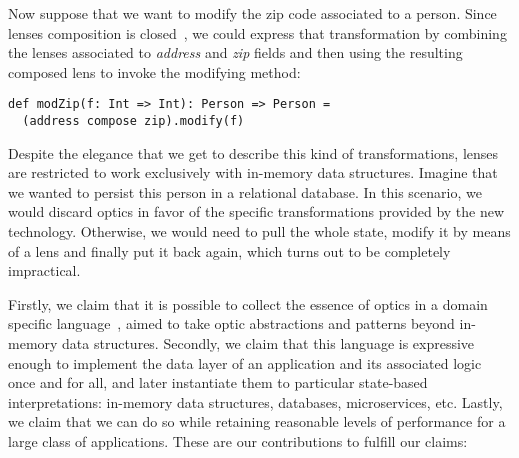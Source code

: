 \documentclass[final, twocolumn, 3p]{elsarticle}
\begin{document}
Now suppose that we want to modify the zip code associated to a person. Since
lenses composition is closed~\cite{pickering2017profunctor}, we could express
that transformation by combining the lenses associated to \emph{address} and
\emph{zip} fields and then using the resulting composed lens to invoke the
modifying method:

\begin{lstlisting}
def modZip(f: Int => Int): Person => Person =
  (address compose zip).modify(f)
\end{lstlisting}

Despite the elegance that we get to describe this kind of transformations,
lenses are restricted to work exclusively with in-memory data structures.
Imagine that we wanted to persist this person in a relational database. In this
scenario, we would discard optics in favor of the specific transformations
provided by the new technology. Otherwise, we would need to pull the whole
state, modify it by means of a lens and finally put it back again, which turns
out to be completely impractical.

Firstly, we claim that it is possible to collect the essence of optics in a
domain specific language~\cite{hudak1996building}, aimed to take optic
abstractions and patterns beyond in-memory data structures. Secondly, we claim
that this language is expressive enough to implement the data layer of an
application and its associated logic once and for all, and later instantiate
them to particular state-based interpretations: in-memory data structures,
databases, microservices, etc. Lastly, we claim that we can do so while
retaining reasonable levels of performance for a large class of applications.
These are our contributions to fulfill our claims:
\end{document}
